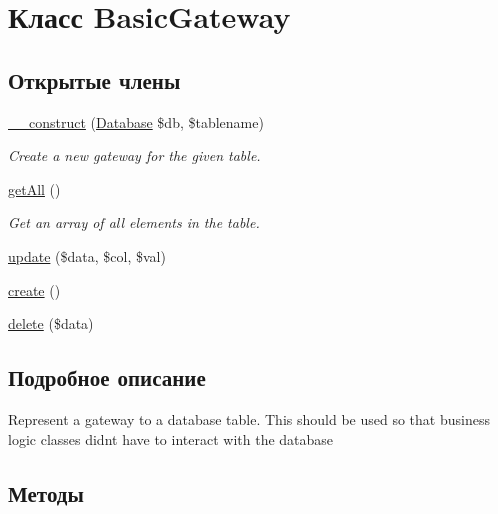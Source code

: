 \hypertarget{classBasicGateway}{}\section{Класс Basic\+Gateway}
\label{classBasicGateway}
\subsection*{Открытые члены}
\begin{DoxyCompactItemize}
\item 
\hypertarget{classBasicGateway_a8f81fcf05bbf2ecccf1c8ac68043e58f}{}\hyperlink{classBasicGateway_a8f81fcf05bbf2ecccf1c8ac68043e58f}{\+\_\+\+\_\+construct} (\hyperlink{classDatabase}{Database} \$db, \$tablename)\label{classBasicGateway_a8f81fcf05bbf2ecccf1c8ac68043e58f}

\begin{DoxyCompactList}\small\item\em Create a new gateway for the given table. \end{DoxyCompactList}\item 
\hypertarget{classBasicGateway_a479340638f40df0f02d833b8326b26d5}{}\hyperlink{classBasicGateway_a479340638f40df0f02d833b8326b26d5}{get\+All} ()\label{classBasicGateway_a479340638f40df0f02d833b8326b26d5}

\begin{DoxyCompactList}\small\item\em Get an array of all elements in the table. \end{DoxyCompactList}\item 
\hyperlink{classBasicGateway_aaca2505381d589b069c4a5ba870be63d}{update} (\$data, \$col, \$val)
\item 
\hyperlink{classBasicGateway_a26ff35b0c74ca7faf3f2aa20cfa8bf18}{create} ()
\item 
\hyperlink{classBasicGateway_ae3acd2ba4018730745410b9cd59aff75}{delete} (\$data)
\end{DoxyCompactItemize}


\subsection{Подробное описание}
Represent a gateway to a database table. This should be used so that business logic classes didn\textquotesingle{}t have to interact with the database 

\subsection{Методы}
\hypertarget{classBasicGateway_a26ff35b0c74ca7faf3f2aa20cfa8bf18}{}
